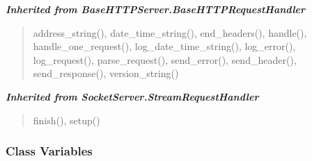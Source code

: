 \large{\textbf{\textit{Inherited from BaseHTTPServer.BaseHTTPRequestHandler}}}

\begin{quote}
address\_string(), date\_time\_string(), end\_headers(), handle(), handle\_one\_request(), log\_date\_time\_string(), log\_error(), log\_request(), parse\_request(), send\_error(), send\_header(), send\_response(), version\_string()
\end{quote}

\large{\textbf{\textit{Inherited from SocketServer.StreamRequestHandler}}}

\begin{quote}
finish(), setup()
\end{quote}


  \subsubsection{Class Variables}

